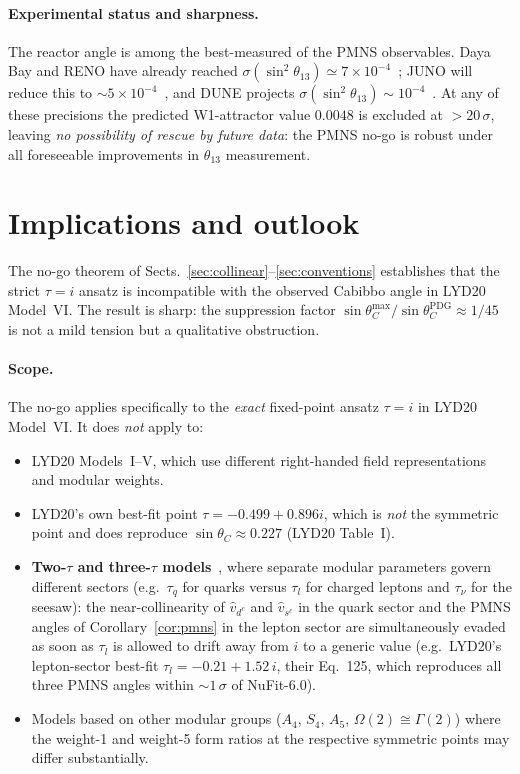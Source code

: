 \documentclass[a4paper,11pt]{article}
\newcommand{\sinTC}{\sin\theta_C}
\begin{document}
\paragraph{Experimental status and sharpness.}
The reactor angle is among the best-measured of the PMNS observables.
Daya Bay and RENO have already reached $\sigma(\sin^2\theta_{13})
\simeq 7\times 10^{-4}$~\cite{NuFit60}; JUNO will reduce this to
$\sim 5\times 10^{-4}$~\cite{JUNO_subpercent}, and DUNE projects
$\sigma(\sin^2\theta_{13})\sim 10^{-4}$~\cite{DUNE_TDR2}.  At any of
these precisions the predicted W1-attractor value $0.0048$ is excluded
at $>20\,\sigma$, leaving \emph{no possibility of rescue by future
data}: the PMNS no-go is robust under all foreseeable improvements in
$\theta_{13}$ measurement.

\section{Implications and outlook}
\label{sec:outlook}

The no-go theorem of Sects.~\ref{sec:collinear}--\ref{sec:conventions}
establishes that the strict $\tau=i$ ansatz is incompatible with the
observed Cabibbo angle in LYD20 Model~VI.  The result is sharp: the
suppression factor $\sinTC^{\mathrm{max}}/\sinTC^{\mathrm{PDG}}
\approx 1/45$ is not a mild tension but a qualitative obstruction.

\paragraph{Scope.}
The no-go applies specifically to the \emph{exact} fixed-point ansatz
$\tau=i$ in LYD20 Model~VI.  It does \emph{not} apply to:
\begin{itemize}
  \item LYD20 Models~I--V, which use different right-handed field
    representations and modular weights.
  \item LYD20's own best-fit point $\tau=-0.499+0.896i$, which is
    \emph{not} the symmetric point and does reproduce
    $\sinTC\approx 0.227$ (LYD20 Table~I).
  \item \textbf{Two-$\tau$ and three-$\tau$
    models}~\cite{DuWang22,AbbasKhalil22}, where separate modular
    parameters govern different sectors (e.g.~$\tau_q$ for quarks
    versus $\tau_l$ for charged leptons and $\tau_\nu$ for the seesaw):
    the near-collinearity of $\hat{v}_{d^c}$ and $\hat{v}_{s^c}$ in the
    quark sector and the PMNS angles of Corollary~\ref{cor:pmns} in the
    lepton sector are simultaneously evaded as soon as
    $\tau_l$ is allowed to drift away from $i$ to a generic value
    (e.g.~LYD20's lepton-sector best-fit $\tau_l = -0.21 + 1.52\,i$,
    their Eq.~125, which reproduces all three PMNS angles within
    $\sim 1\,\sigma$ of NuFit-6.0).
  \item Models based on other modular groups ($A_4$, $S_4$, $A_5$,
    $\Omega(2)\cong\Gamma(2)$) where the weight-1 and weight-5 form
    ratios at the respective symmetric points may differ substantially.
\end{itemize}
\end{document}
